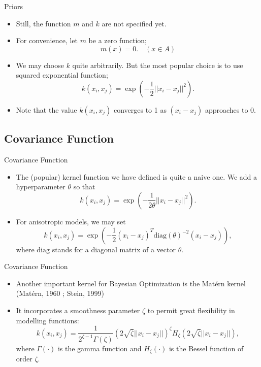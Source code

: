 \documentclass{beamer}
\begin{document}
\begin{frame}{Priors}
\begin{itemize}
\item
Still, the function \(m\) and \(k\) are not specified yet.
\item
For convenience, let \(m\) be a zero function;
\[m(x)=0.\quad(x\in A)\]
\item
We may choose \(k\) quite arbitrarily.
But the most popular choice is to use squared exponential function;
\[k(x_i,x_j)=\exp\left(-\frac12||x_i-x_j||^2\right).\]
\item
Note that the value \(k(x_i,x_j)\) converges to 1 as \((x_i-x_j)\) approaches to 0.
\end{itemize}
\end{frame}

\subsection{Covariance Function}
\begin{frame}{Covariance Function}
\begin{itemize}
\item
The (popular) kernel function we have defined is quite a naive one.
We add a \alert{hyperparameter} \(\theta\) so that
\[k(x_i,x_j)=\exp\left(-\frac1{2\theta}||x_i-x_j||^2\right).\]
\item
For anisotropic models, we may set
\[k(x_i,x_j)=\exp\left(-\frac12(x_i-x_j)^T\text{diag}(\theta)^{-2}(x_i-x_j)\right),\]
where \(\text{diag}\) stands for a diagonal matrix of a vector \(\theta\).
\end{itemize}
\end{frame}

\begin{frame}{Covariance Function}
\begin{itemize}
\item
Another important kernel for Bayesian Optimization is the Matérn kernel (Matérn, 1960 ; Stein, 1999)
\item
It incorporates a smoothness parameter \(\zeta\) to permit great flexibility in modelling functions:
\[k(x_i,x_j)=\frac1{2^{\zeta-1}\Gamma(\zeta)}\left(2\sqrt\zeta||x_i-x_j||\right)^\zeta H_\zeta\left(2\sqrt\zeta ||x_i-x_j||\right),\]
where \(\Gamma(\cdot)\) is the gamma function and \(H_\zeta(\cdot)\) is the Bessel function of order \(\zeta\).
\end{itemize}
\end{frame}


\end{document}
